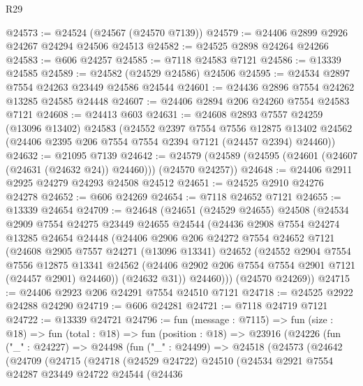 \begin{lexlean}{R29}
\begin{coremodule}
@24573 := @24524 (@24567 (@24570 @7139))
@24579 := @24406 @2899 @2926 @24267 @24294 @24506 @24513
@24582 := @24525 @2898 @24264 @24266
@24583 := @606 @24257
@24585 := @7118 @24583 @7121
@24586 := @13339 @24585
@24589 := @24582 (@24529 @24586) @24506
@24595 := @24534 @2897 @7554 @24263 @23449 @24586 @24544
@24601 := @24436 @2896 @7554 @24262 @13285 @24585 @24448
@24607 := @24406 @2894 @206 @24260 @7554 @24583 @7121
@24608 := @24413 @603
@24631 := @24608
    @2893
    @7557
    @24259
    (@13096 @13402)
    @24583
    (@24552
      @2397
      @7554
      @7556
      @12875
      @13402
      @24562
      (@24406 @2395 @206 @7554 @7554 @2394 @7121 (@24457 @2394) @24460))
@24632 := @21095 @7139
@24642 := @24579 (@24589 (@24595 (@24601 (@24607 (@24631 (@24632 @24)) @24460))) (@24570 @24257))
@24648 := @24406 @2911 @2925 @24279 @24293 @24508 @24512
@24651 := @24525 @2910 @24276 @24278
@24652 := @606 @24269
@24654 := @7118 @24652 @7121
@24655 := @13339 @24654
@24709 := @24648
    (@24651
      (@24529 @24655)
      @24508
      (@24534
        @2909
        @7554
        @24275
        @23449
        @24655
        @24544
        (@24436
          @2908
          @7554
          @24274
          @13285
          @24654
          @24448
          (@24406
            @2906
            @206
            @24272
            @7554
            @24652
            @7121
            (@24608
              @2905
              @7557
              @24271
              (@13096 @13341)
              @24652
              (@24552
                @2904
                @7554
                @7556
                @12875
                @13341
                @24562
                (@24406 @2902 @206 @7554 @7554 @2901 @7121 (@24457 @2901) @24460))
              (@24632 @31))
            @24460)))
      (@24570 @24269))
@24715 := @24406 @2923 @206 @24291 @7554 @24510 @7121
@24718 := @24525 @2922 @24288 @24290
@24719 := @606 @24281
@24721 := @7118 @24719 @7121
@24722 := @13339 @24721
@24796 := fun (message : @7115) =>
  fun (size : @18) =>
  fun (total : @18) =>
  fun (position : @18) =>
  @23916
    (@24226
      (fun ("_" : @24227) =>
      @24498
        (fun ("_" : @24499) =>
        @24518
          (@24573
            (@24642
              (@24709
                (@24715
                  (@24718
                    (@24529 @24722)
                    @24510
                    (@24534
                      @2921
                      @7554
                      @24287
                      @23449
                      @24722
                      @24544
                      (@24436

\end{coremodule}
\end{lexlean}
